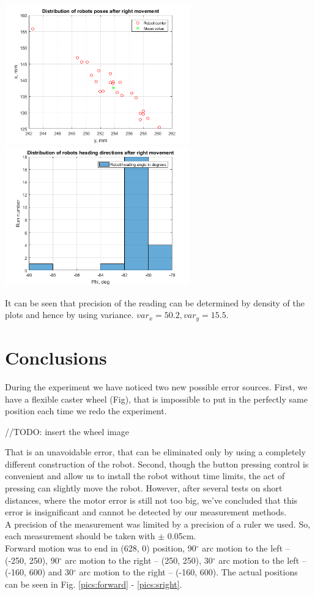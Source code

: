 \documentclass[a4paper, 12pt]{article}
\begin{document}
\begin{center}
  \includegraphics[width=0.6\textwidth]{RR}
  \includegraphics[width=0.6\textwidth]{RRphi}
\end{center}

It can be seen that precision of the reading can be determined by density of the plots and hence by using variance. $var_x = 50.2,var_y = 15.5$.


\section{Conclusions}
During the experiment we have noticed two new possible error sources. First, we have a flexible caster wheel (Fig), that is impossible to put in the perfectly same position each time we redo the experiment.

//TODO: insert the wheel image

That is an unavoidable error, that can be eliminated only by using a completely different construction of the robot. Second, though the button pressing control is convenient and allow us to install the robot without time limits, the act of pressing can slightly move the robot. However, after several tests on short distances, where the motor error is still not too big, we've concluded that this error is insignificant and cannot be detected by our measurement methods. \\

A precision of the measurement was limited by a precision of a ruler we used. So, each measurement should be taken with $\pm$ 0.05cm.\\
Forward motion was to end in (628, 0) position, 90$^{\circ}$ arc motion to the left -- (-250, 250), 90$^{\circ}$ arc motion to the right -- (250, 250), 30$^{\circ}$ arc motion to the left -- (-160, 600) and 30$^{\circ}$ arc motion to the right -- (-160, 600). The actual positions can be seen in Fig. \ref{pics:forward} - \ref{pics:sright}.
\end{document}
